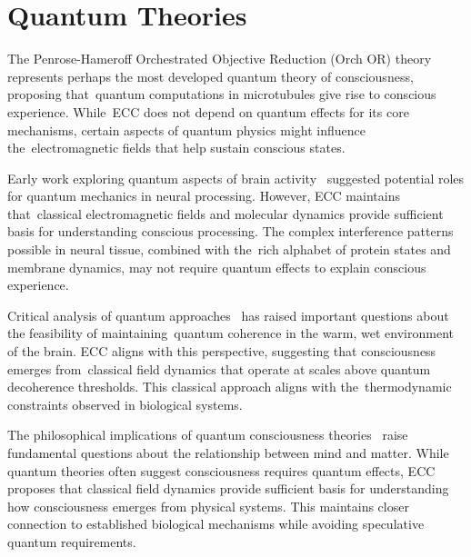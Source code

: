 \section{Quantum Theories~}

The Penrose-Hameroff Orchestrated Objective Reduction (Orch OR) theory~\cite{Hameroff2014, Penrose1994} represents perhaps the most developed quantum theory of consciousness, proposing that~quantum computations in microtubules give rise to conscious experience. While~ECC does not depend on quantum effects for its core mechanisms, certain aspects of quantum physics might influence the~electromagnetic fields that help sustain conscious states.

Early work exploring quantum aspects of brain activity~\cite{Beck1992, Bohm1990} suggested potential roles for quantum mechanics in neural processing. However, ECC maintains that~classical electromagnetic fields and molecular dynamics provide sufficient basis for understanding conscious processing. The complex interference patterns possible in neural tissue, combined with the~rich alphabet of protein states and membrane dynamics, may not require quantum effects to explain conscious experience.

Critical analysis of quantum approaches~\cite{Tegmark2000, Koch2006} has raised important questions about the feasibility of maintaining~quantum coherence in the warm, wet environment of the brain. ECC aligns with this perspective, suggesting that consciousness emerges from~classical field dynamics that operate at scales above quantum decoherence thresholds. This classical approach aligns with the~thermodynamic constraints observed in biological systems.

The philosophical implications of quantum consciousness theories~\cite{Stapp2009, Chalmers2018} raise fundamental questions about the relationship between mind and matter. While quantum theories often suggest consciousness requires quantum effects, ECC proposes that classical field dynamics provide sufficient basis for understanding how consciousness emerges from physical systems. This maintains closer connection to established biological mechanisms while avoiding speculative quantum requirements.

